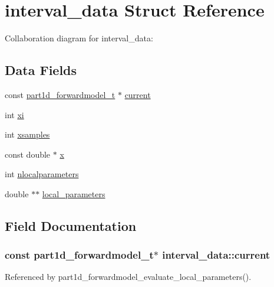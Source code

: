 \hypertarget{structinterval__data}{}\section{interval\+\_\+data Struct Reference}
\label{structinterval__data}


Collaboration diagram for interval\+\_\+data\+:
\subsection*{Data Fields}
\begin{DoxyCompactItemize}
\item 
const \hyperlink{part1d__forwardmodel_8h_adaad64fbca97fa82ba80fe8371e4f1d9}{part1d\+\_\+forwardmodel\+\_\+t} $\ast$ \hyperlink{structinterval__data_af957c095e65c554383ba4e93d9df4624}{current}
\item 
int \hyperlink{structinterval__data_a749c3569a6232d755e66e59577b679e1}{xi}
\item 
int \hyperlink{structinterval__data_ac09bba53de396eb73698ce4f05622917}{xsamples}
\item 
const double $\ast$ \hyperlink{structinterval__data_a8ebc5c37f275985fd6f17bb3988ebe4c}{x}
\item 
int \hyperlink{structinterval__data_ade5ceec3ebe5333bf2ace691bb44af27}{nlocalparameters}
\item 
double $\ast$$\ast$ \hyperlink{structinterval__data_a1e7fbf7de483bc5799d45216be77801f}{local\+\_\+parameters}
\end{DoxyCompactItemize}


\subsection{Field Documentation}
\subsubsection[{\texorpdfstring{current}{current}}]{\setlength{\rightskip}{0pt plus 5cm}const {\bf part1d\+\_\+forwardmodel\+\_\+t}$\ast$ interval\+\_\+data\+::current}\hypertarget{structinterval__data_af957c095e65c554383ba4e93d9df4624}{}\label{structinterval__data_af957c095e65c554383ba4e93d9df4624}


Referenced by part1d\+\_\+forwardmodel\+\_\+evaluate\+\_\+local\+\_\+parameters().

